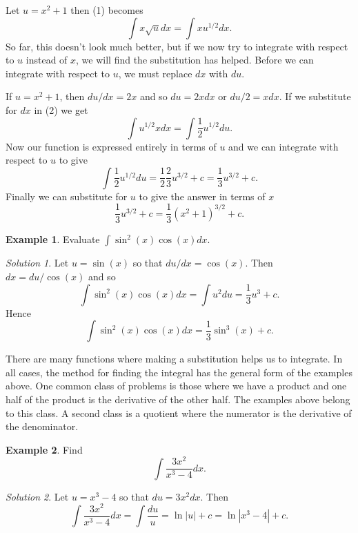 \documentclass[
  11pt,
  oneside]{book}
\newcommand{\slide}{}
\newcommand{\cpybx}{}
\newcommand{\ecpybx}{}
\theoremstyle{definition}
\theoremstyle{definition}
\newtheorem{example}{Example}[chapter]
\theoremstyle{definition}
\theoremstyle{definition}
\theoremstyle{remark}
\newtheorem*{solution}{Solution}
\begin{document}
Let \(u = x^2+ 1\) then (1) becomes
\[
\int x\sqrt{u} dx=\int xu^{1/2} dx.\tag{2}
\]
So far, this doesn't look much better, but if we now try to integrate with respect to \(u\) instead of \(x\), we will find the substitution has helped. Before we can integrate with respect to \(u\), we must replace \(dx\) with \(du\).

If \(u = x^2+ 1\), then \(du/dx = 2x\) and so \(du = 2x dx\) or \(du/2 = xdx\).
If we substitute for \(dx\) in (2) we get
\[
\int u^{1/2}xdx = \int\frac12u^{1/2}du.
\]
Now our function is expressed entirely in terms of \(u\) and we can integrate with respect to \(u\) to give
\[
\int\frac12u^{1/2}du = \frac 12\frac23u^{3/2}+c = \frac13u^{3/2}+c.
\]
Finally we can substitute for \(u\) to give the answer in terms of \(x\)
\[
\frac 13u^{3/2}+c = \frac13(x^2+1)^{3/2}+c.
\]
\slide

\cpybx

\begin{example}
Evaluate \(\displaystyle\int\sin^2(x)\cos(x)dx\).
\end{example}

\ecpybx\slide\copy\copybox

\begin{solution}
Let \(u = \sin(x)\) so that \(du/dx = \cos(x)\). Then \(dx = du/\cos(x)\) and so
\[
\int\sin^2(x)\cos(x)dx = \int u^2du = \frac 13u^3+c.
\]
Hence
\[
\int\sin^2(x)\cos(x)dx = \frac 13\sin^3(x) + c.
\]
\end{solution}

\slide

There are many functions where making a substitution helps us to integrate. In all cases, the method for finding the integral has the general form of the examples above. One common class of problems is those where we have a product and one half of the product is the derivative of the other half. The examples above belong to this class. A second class is a quotient where the numerator is the derivative of the denominator.

\cpybx

\begin{example}
Find
\[
\int\frac{3x^2}{x^3-4}dx.
\]
\end{example}

\ecpybx\slide\copy\copybox

\begin{solution}
Let \(u = x^3-4\) so that \(du = 3x^2dx\). Then
\[
\int\frac{3x^2}{x^3-4}dx = \int \frac{du}{u} = \ln|u|+c = \ln|x^3-4|+c.
\]
\end{solution}
\end{document}
